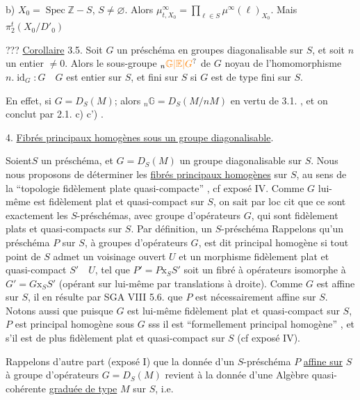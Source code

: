 b) $X_0=\operatorname{Spec}\mathbb Z-S$, $S\ne\varnothing$. Alors
$\mu^\infty_{t,X_0}=\prod_{\ell\in S}\mu^\infty(\ell)_{X_0}$. Mais  $\pi^t_2(X_0/D'_0)$

???
\uline{Corollaire} 3.5. Soit $G$ un  préschéma en groupes diagonalisable
sur $S$, et soit $n$ un entier $\ne0$. Alors le sous-groupe $ {}_n\unsure{\mathbb G|\mathbb E|G}$ de $G$ noyau
de l'homomorphisme $n.\operatorname{id}_G:G\quad G$ est entier sur $S$, et fini sur
$S$ si $G$ est de type fini sur $S$.

En effet, si $G=D_S(M)$; alors $ {}_n\mathbb G=D_S(M/nM)$ en vertu de 3.1. , et
on conclut par 2.1. c) c') .

4. \uline{Fibrés principaux homogènes sous un groupe diagonalisable}.

Soient$S$ un préschéma, et $G=D_S(M)$ un groupe diagonalisable sur $S$.
Nous nous proposons de déterminer les \uline{fibrés principaux homogènes} sur
$S$, au sens de la ``topologie fidèlement plate quasi-compacte'' , cf
exposé IV. Comme $G$ lui-même est fidèlement plat et quasi-compact sur
$S$, on sait par loc cit que ce sont exactement les $S$-préschémas, 
avec groupe d'opérateurs $G$,  qui sont fidèlement plats et quasi-compacts sur $S$. Par définition, un $S$-préschéma \quad Rappelons qu'un
préschéma $P$ sur $S$, à groupes d'opérateurs $G$, est dit principal homogène
si tout point de $S$ admet un voisinage ouvert $U$ et un morphisme fidèlement plat et quasi-compact $S'\quad U$, tel que $P'=P\mathbin{\mathrm{x}}_S S'$ soit un fibré
à opérateurs isomorphe à $G'=G\mathbin{\mathrm{x}}_S S'$ (opérant sur lui-même par translations à droite). Comme $G$ est affine sur $S$, il en résulte par SGA
VIII 5.6. que $P$ est nécessairement affine sur $S$. Notons aussi
que puisque $G$ est lui-même fidèlement plat et quasi-compact sur $S$, $P$
est principal homogène sous $G$ sss il est ``formellement principal
homogène'' , et s'il est de plus fidèlement plat et quasi-compact sur $S$
(cf exposé IV).

Rappelons d'autre part (exposé I) que la donnée d'un $S$-préschéma $P$ \uline{affine sur} $S$ à groupe d'opérateurs $G=D_S(M)$ revient à la donnée d'une Algèbre quasi-cohérente \uline{graduée de type} $M$ sur $S$, i.e.

